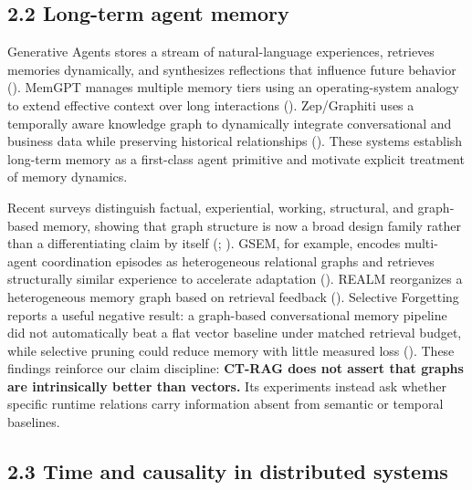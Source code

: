 \documentclass[
  11pt,
]{article}
\begin{document}
\subsection{2.2 Long-term agent memory}\label{long-term-agent-memory}

Generative Agents stores a stream of natural-language experiences,
retrieves memories dynamically, and synthesizes reflections that
influence future behavior (). MemGPT manages multiple memory tiers using an operating-system
analogy to extend effective context over long interactions
(). Zep/Graphiti uses
a temporally aware knowledge graph to dynamically integrate
conversational and business data while preserving historical
relationships ().
These systems establish long-term memory as a first-class agent
primitive and motivate explicit treatment of memory dynamics.

Recent surveys distinguish factual, experiential, working, structural,
and graph-based memory, showing that graph structure is now a broad
design family rather than a differentiating claim by itself
(;
). GSEM, for
example, encodes multi-agent coordination episodes as heterogeneous
relational graphs and retrieves structurally similar experience to
accelerate adaptation ().
REALM reorganizes a heterogeneous memory graph based on retrieval
feedback (). Selective
Forgetting reports a useful negative result: a graph-based
conversational memory pipeline did not automatically beat a flat vector
baseline under matched retrieval budget, while selective pruning could
reduce memory with little measured loss
().
These findings reinforce our claim discipline: \textbf{CT-RAG does not
assert that graphs are intrinsically better than vectors.} Its
experiments instead ask whether specific runtime relations carry
information absent from semantic or temporal baselines.

\subsection{2.3 Time and causality in distributed
systems}\label{time-and-causality-in-distributed-systems}
\end{document}
